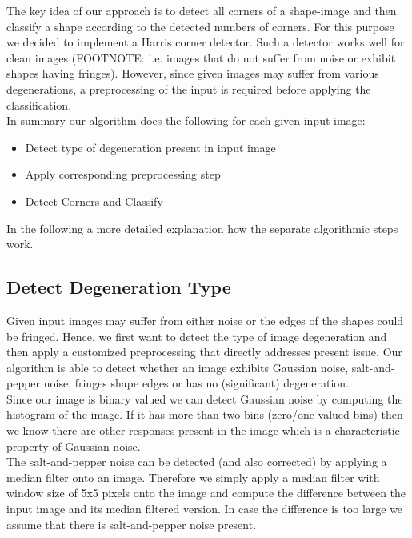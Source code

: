 \documentclass[conference]{IEEEtran}
\begin{document}
The key idea of our approach is to detect all corners of a shape-image and then classify a shape according to the detected numbers of corners. For this purpose we decided to implement a Harris corner detector. Such a detector works well for clean images (FOOTNOTE: i.e. images that do not suffer from noise or exhibit shapes having fringes). However, since given images may suffer from various degenerations, a preprocessing of the input is required before applying the classification. \\

In summary our algorithm does the following for each given input image:
	\begin{itemize}
		\item Detect type of degeneration present in input image
		\item Apply corresponding preprocessing step
		\item Detect Corners and Classify
	\end{itemize}  
	
In the following a more detailed explanation how the separate algorithmic steps work.

\subsection{Detect Degeneration Type}
Given input images may suffer from either noise or the edges of the shapes could be fringed.
Hence, we first want to detect the type of image degeneration and then apply a customized preprocessing that directly addresses present issue. Our algorithm is able to detect whether an image exhibits Gaussian noise, salt-and-pepper noise, fringes shape edges or has no (significant) degeneration. \\

Since our image is binary valued we can detect Gaussian noise by computing the histogram of the image. If it has more than two bins (zero/one-valued bins) then we know there are other responses present in the image which is a characteristic property of Gaussian noise. \\

The salt-and-pepper noise can be detected (and also corrected) by applying a median filter onto an image. 
Therefore we simply apply a median filter with window size of 5x5 pixels onto the image and compute the difference between the input image and its median filtered version. 
In case the difference is too large we assume that there is salt-and-pepper noise present. \\
\end{document}

